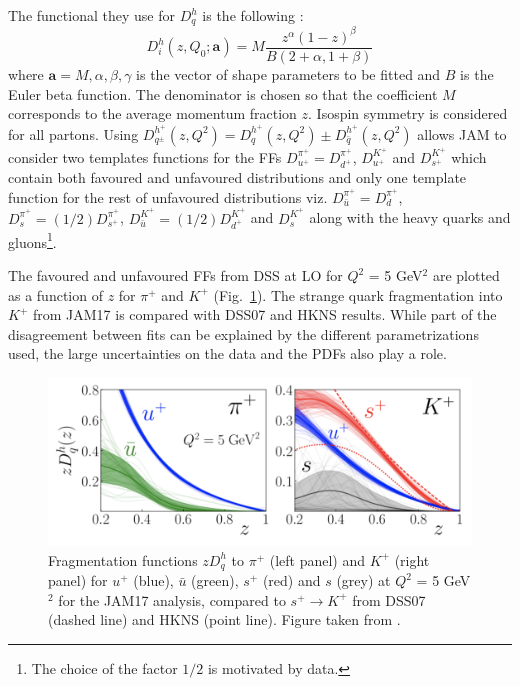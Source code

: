The functional they use for $D^h_q$ is the following :
%
\begin{equation}
  D^h_i (z,Q_0;\textbf{a}) = M \frac{z^{\alpha}(1-z)^{\beta}}{B(2+\alpha,1+\beta)}
  \label{eq:JAMparam}
\end{equation}
%
where $\textbf{a} = {M,\alpha,\beta,\gamma}$ is the vector of shape parameters to be fitted and $B$ is the Euler beta function. The denominator is chosen so that the coefficient $M$ corresponds to the average momentum fraction $z$. Isospin symmetry is considered for all partons. Using $D^{h^{+}}_{q^{\pm}}(z,Q^2) = D^{h^{+}}_{q}(z,Q^2) \pm D^{h^{+}}_{\bar{q}}(z,Q^2)$ allows JAM to consider two templates functions for the FFs $D^{\pi^{+}}_{u^{+}} = D^{\pi^{+}}_{d^{+}}$, $D^{K^{+}}_{u^{+}}$ and $D^{K^{+}}_{s^{+}}$ which contain both favoured and unfavoured distributions and only one template function for the rest of unfavoured distributions viz. $D^{\pi^{+}}_{\bar{u}} = D^{\pi^{+}}_{d}$, $D^{\pi^{+}}_{s} = (1/2)D^{\pi^{+}}_{s^{+}}$, $D^{K^{+}}_{\bar{u}} = (1/2)D^{K^{+}}_{d^{+}}$ and $D^{K^{+}}_{s}$ along with the heavy quarks and gluons\footnote{The choice of the factor $1/2$ is motivated by data.}.

The favoured and unfavoured FFs from DSS at LO for $Q^2$ = 5 GeV$^2$ are plotted as a function of $z$ for $\pi^+$ and $K^+$ (Fig.~\ref{pic:JAMcomp}). The strange quark fragmentation into $K^+$ from JAM17 is compared with DSS07 and HKNS results. While part of the disagreement between fits can be explained by the different parametrizations used, the large uncertainties on the data and the PDFs also play a role.

\begin{figure}[!h]
  \centering
	\includegraphics[scale=0.5]{./gfx/JAMcomp.png}
	\caption{Fragmentation functions $zD^h_q$ to $\pi^+$ (left panel) and $K^+$ (right panel) for $u^+$ (blue), $\bar{u}$ (green), $s^+$ (red) and $s$ (grey) at $Q^2$ = 5 GeV$^2$ for the JAM17 analysis, compared to $s^+ \rightarrow K^+$ from DSS07 (dashed line) and HKNS (point line). Figure taken from \cite{JAM}.}
	\label{pic:JAMcomp}
\end{figure}

